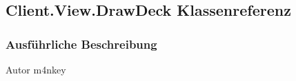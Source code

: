 \hypertarget{a00037}{\subsection{Client.\-View.\-Draw\-Deck Klassenreferenz}
\label{a00037}
}


\subsubsection{Ausführliche Beschreibung}
\begin{DoxyAuthor}{Autor}
m4nkey 
\end{DoxyAuthor}
